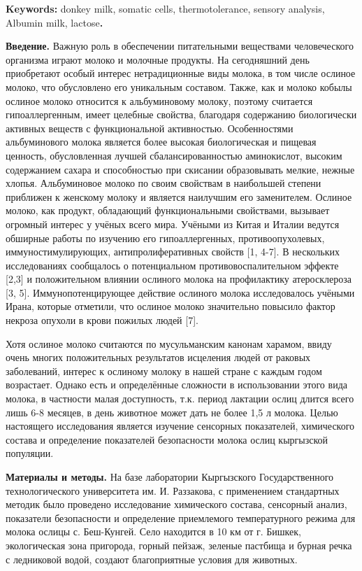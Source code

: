 {\bfseries Keywords:} donkey milk, somatic cells, thermotolerance, sensory
analysis, Albumin milk, lactose{\bfseries .}

{\bfseries Введение.} Важную роль в обеспечении питательными веществами
человеческого организма играют молоко и молочные продукты. На
сегодняшний день приобретают особый интерес нетрадиционные виды молока,
в том числе ослиное молоко, что обусловлено его уникальным составом.
Также, как и молоко кобылы ослиное молоко относится к альбуминовому
молоку, поэтому считается гипоаллергенным, имеет целебные свойства,
благодаря содержанию биологически активных веществ с функциональной
активностью. Особенностями альбуминового молока является более высокая
биологическая и пищевая ценность, обусловленная лучшей
сбалансированностью аминокислот, высоким содержанием сахара и
способностью при скисании образовывать мелкие, нежные хлопья.
Альбуминовое молоко по своим свойствам в наибольшей степени приближен к
женскому молоку и является наилучшим его заменителем. Ослиное молоко,
как продукт, обладающий функциональными свойствами, вызывает огромный
интерес у учёных всего мира. Учёными из Китая и Италии ведутся обширные
работы по изучению его гипоаллергенных, противоопухолевых,
иммуностимулирующих, антипролиферативных свойств {[}1, 4-7{]}. В
нескольких исследованиях сообщалось о потенциальном
противовоспалительном эффекте {[}2,3{]} и положительном влиянии ослиного
молока на профилактику атеросклероза {[}3, 5{]}. Иммунопотенцирующее
действие ослиного молока исследовалось учёными Ирана, которые отметили,
что ослиное молоко значительно повысило фактор некроза опухоли в крови
пожилых людей {[}7{]}.

Хотя ослиное молоко считаются по мусульманским канонам харамом, ввиду
очень многих положительных результатов исцеления людей от раковых
заболеваний, интерес к ослиному молоку в нашей стране с каждым годом
возрастает. Однако есть и определённые сложности в использовании этого
вида молока, в частности малая доступность, т.к. период лактации ослиц
длится всего лишь 6-8 месяцев, в день животное может дать не более 1,5 л
молока. Целью настоящего исследования является изучение сенсорных
показателей, химического состава и определение показателей безопасности
молока ослиц кыргызской популяции.

{\bfseries Материалы и методы.} На базе лаборатории Кыргызского
Государственного технологического университета им. И. Раззакова, с
применением стандартных методик было проведено исследование химического
состава, сенсорный анализ, показатели безопасности и определение
приемлемого температурного режима для молока ослицы с. Беш-Кунгей. Село
находится в 10 км от г. Бишкек, экологическая зона пригорода, горный
пейзаж, зеленые пастбища и бурная речка с ледниковой водой, создают
благоприятные условия для животных.

